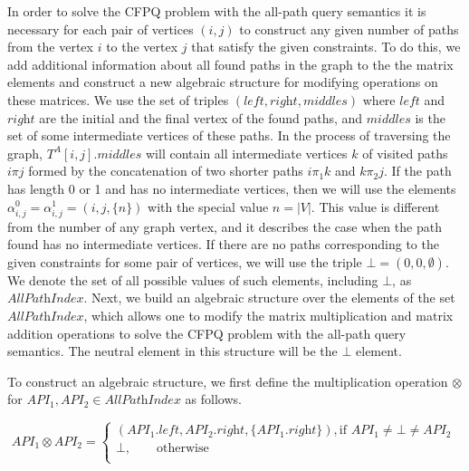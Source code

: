 In order to solve the CFPQ problem with the all-path query semantics it is necessary for each pair of vertices $(i, j)$ to construct any given number of paths from the vertex $i$ to the vertex $j$ that satisfy the given constraints. To do this, we add additional information about all found paths in the graph to the the matrix elements and construct a new algebraic structure for modifying operations on these matrices. We use the set of triples $(\textit{left}, \textit{right}, \textit{middles})$ where $\textit{left}$ and $\textit{right}$ are the initial and the final vertex of the found paths, and $\textit{middles}$ is the set of some intermediate vertices of these paths. In the process of traversing the graph, $T^A[i, j].\textit{middles}$ will contain all intermediate vertices $k$ of visited paths $i \pi j$ formed by the concatenation of two shorter paths $i \pi_1 k$ and $k \pi_2 j$. If the path has length 0 or 1 and has no intermediate vertices, then we will use the elements $\alpha^0_{i, j} = \alpha^1_{i, j} = (i, j, \{n\})$ with the special value $n = |V|$. This value is different from the number of any graph vertex, and it describes the case when the path found has no intermediate vertices. If there are no paths corresponding to the given constraints for some pair of vertices, we will use the triple $\bot = (0, 0, \emptyset)$. We denote the set of all possible values of such elements, including $\bot$, as $\textit{AllPathIndex}$. Next, we build an algebraic structure over the elements of the set $\textit{AllPathIndex}$, which allows one to modify the matrix multiplication and matrix addition operations to solve the CFPQ problem with the all-path query semantics. The neutral element in this structure will be the $\bot$ element.

To construct an algebraic structure, we first define the multiplication operation $\otimes$ for \mbox{$\textit{API}_1, \textit{API}_2 \in \textit{AllPathIndex}$} as follows.

$$\textit{API}_1 \otimes \textit{API}_2 = \begin{cases}
      (\textit{API}_1.\textit{left}, \textit{API}_2.\textit{right}, \{\textit{API}_1.\textit{right}\}), \text{if $\textit{API}_1 \neq \bot \neq \textit{API}_2$} \\
      \bot, \qquad \text{otherwise} \\
    \end{cases}\
$$

